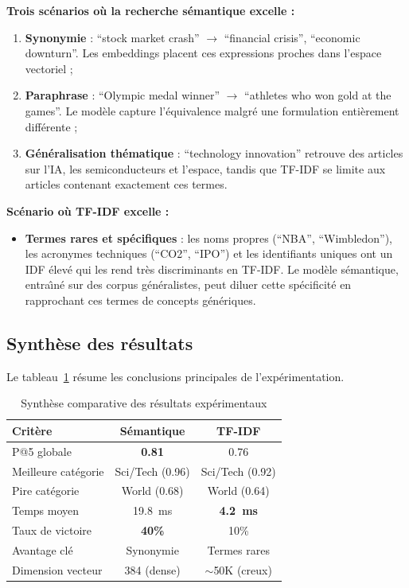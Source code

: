 \documentclass[12pt,a4paper]{article}
\begin{document}
\textbf{Trois sc\'{e}narios o\`{u} la recherche s\'{e}mantique excelle :}
\begin{enumerate}[noitemsep]
    \item \textbf{Synonymie} : ``stock market crash'' $\rightarrow$ ``financial crisis'', ``economic downturn''. Les embeddings placent ces expressions proches dans l'espace vectoriel ;
    \item \textbf{Paraphrase} : ``Olympic medal winner'' $\rightarrow$ ``athletes who won gold at the games''. Le mod\`{e}le capture l'\'{e}quivalence malgr\'{e} une formulation enti\`{e}rement diff\'{e}rente ;
    \item \textbf{G\'{e}n\'{e}ralisation th\'{e}matique} : ``technology innovation'' retrouve des articles sur l'IA, les semiconducteurs et l'espace, tandis que TF-IDF se limite aux articles contenant exactement ces termes.
\end{enumerate}

\textbf{Sc\'{e}nario o\`{u} TF-IDF excelle :}
\begin{itemize}[noitemsep]
    \item \textbf{Termes rares et sp\'{e}cifiques} : les noms propres (``NBA'', ``Wimbledon''), les acronymes techniques (``CO2'', ``IPO'') et les identifiants uniques ont un IDF \'{e}lev\'{e} qui les rend tr\`{e}s discriminants en TF-IDF. Le mod\`{e}le s\'{e}mantique, entra\^{\i}n\'{e} sur des corpus g\'{e}n\'{e}ralistes, peut diluer cette sp\'{e}cificit\'{e} en rapprochant ces termes de concepts g\'{e}n\'{e}riques.
\end{itemize}

\subsection{Synth\`{e}se des r\'{e}sultats}

Le tableau~\ref{tab:synthese} r\'{e}sume les conclusions principales de l'exp\'{e}rimentation.

\begin{table}[H]
\centering
\caption{Synth\`{e}se comparative des r\'{e}sultats exp\'{e}rimentaux}
\label{tab:synthese}
\begin{tabular}{@{}p{3.5cm}cc@{}}
\toprule
\textbf{Crit\`{e}re} & \textbf{S\'{e}mantique} & \textbf{TF-IDF} \\
\midrule
P@5 globale          & \textbf{0.81} & 0.76 \\
Meilleure cat\'{e}gorie & Sci/Tech (0.96) & Sci/Tech (0.92) \\
Pire cat\'{e}gorie     & World (0.68)    & World (0.64) \\
Temps moyen          & 19.8~ms         & \textbf{4.2~ms} \\
Taux de victoire     & \textbf{40\%}   & 10\% \\
Avantage cl\'{e}       & Synonymie       & Termes rares \\
Dimension vecteur    & 384 (dense)     & $\sim$50K (creux) \\
\bottomrule
\end{tabular}
\end{table}
\end{document}
